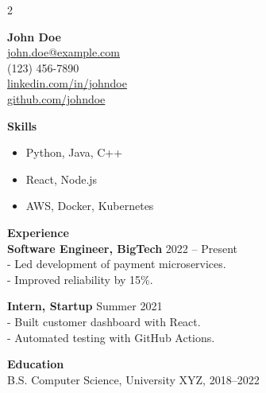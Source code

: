 \documentclass[a4paper,10pt]{article}
\begin{document}
\begin{multicols}{2}

{\huge \textbf{John Doe}}\\
\href{mailto:john.doe@example.com}{john.doe@example.com}\\
(123) 456-7890\\
\href{https://linkedin.com/in/johndoe}{linkedin.com/in/johndoe} \\
\href{https://github.com/johndoe}{github.com/johndoe}

\vfill\null
\columnbreak

\textbf{Skills}\\
\begin{itemize}[leftmargin=*]
    \item Python, Java, C++
    \item React, Node.js
    \item AWS, Docker, Kubernetes
\end{itemize}

\end{multicols}

\vspace{10pt}

\textbf{Experience}\\
\textbf{Software Engineer, BigTech} \hfill 2022 -- Present \\
- Led development of payment microservices. \\
- Improved reliability by 15\%.

\vspace{5pt}

\textbf{Intern, Startup} \hfill Summer 2021 \\
- Built customer dashboard with React. \\
- Automated testing with GitHub Actions.

\vspace{10pt}
\textbf{Education}\\
B.S. Computer Science, University XYZ, 2018--2022
\end{document}
